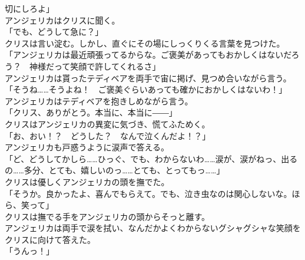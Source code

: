 \documentclass[b5j,10pt,openany]{jsbook}
\begin{document}
切にしろよ」\\アンジェリカはクリスに聞く。\\「でも、どうして急に？」\\クリスは言い淀む。しかし、直ぐにその場にしっくりくる言葉を見つけた。\\「アンジェリカは最近頑張ってるからな。ご褒美があってもおかしくはないだろう？　神様だって笑顔で許してくれるさ」\\アンジェリカは貰ったテディベアを両手で宙に掲げ、見つめ合いながら言う。\\「そうね\ldots{}\ldots{}そうよね！　ご褒美ぐらいあっても確かにおかしくはないわ！」\\アンジェリカはテディベアを抱きしめながら言う。\\「クリス、ありがとう。本当に、本当に――」\\クリスはアンジェリカの異変に気づき、慌てふためく。\\「お、おい！？　どうした？　なんで泣くんだよ！？」\\アンジェリカも戸惑うように涙声で答える。\\「ど、どうしてかしら\ldots{}\ldots{}ひっぐ、でも、わからないわ\ldots{}\ldots{}涙が、涙がねっ、出るの\ldots{}\ldots{}多分、とても、嬉しいのっ\ldots{}\ldots{}とても、とってもっ\ldots{}\ldots{}」\\クリスは優しくアンジェリカの頭を撫でた。\\「そうか。良かったよ、喜んでもらえて。でも、泣き虫なのは関心しないな。ほら、笑って」\\クリスは撫でる手をアンジェリカの頭からそっと離す。\\アンジェリカは両手で涙を拭い、なんだかよくわからないグシャグシャな笑顔をクリスに向けて答えた。\\「うんっ！」
\end{document}
